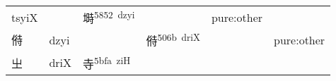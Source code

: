 \documentclass[14pt,a4paper]{scrartcl}
\begin{document}
\begin{longtable}[c]{@{}llllll@{}}
\begin{minipage}[t]{0.14\columnwidth}
tsyiX
\strut\end{minipage} &
\begin{minipage}[t]{0.14\columnwidth}\raggedright\strut
\strut\end{minipage} &
\begin{minipage}[t]{0.14\columnwidth}\raggedright\strut
塒\textsuperscript{5852~dzyi}
\strut\end{minipage} &
\begin{minipage}[t]{0.14\columnwidth}\raggedright\strut
\strut\end{minipage} &
\begin{minipage}[t]{0.14\columnwidth}\raggedright\strut
pure:other
\strut\end{minipage}\tabularnewline
\begin{minipage}[t]{0.14\columnwidth}\raggedright\strut
偫
\strut\end{minipage} &
\begin{minipage}[t]{0.14\columnwidth}\raggedright\strut
dzyi
\strut\end{minipage} &
\begin{minipage}[t]{0.14\columnwidth}\raggedright\strut
\strut\end{minipage} &
\begin{minipage}[t]{0.14\columnwidth}\raggedright\strut
偫\textsuperscript{506b~driX}
\strut\end{minipage} &
\begin{minipage}[t]{0.14\columnwidth}\raggedright\strut
\strut\end{minipage} &
\begin{minipage}[t]{0.14\columnwidth}\raggedright\strut
pure:other
\strut\end{minipage}\tabularnewline
\begin{minipage}[t]{0.14\columnwidth}\raggedright\strut
㞢
\strut\end{minipage} &
\begin{minipage}[t]{0.14\columnwidth}\raggedright\strut
driX
\strut\end{minipage} &
\begin{minipage}[t]{0.14\columnwidth}\raggedright\strut
寺\textsuperscript{5bfa~ziH}
\strut\end{minipage} &
\begin{minipage}[t]{0.14\columnwidth}\raggedright\strut
\strut\end{minipage} &
\begin{minipage}[t]{0.14\columnwidth}\raggedright\strut
\strut\end{minipage} &

\end{longtable}
\end{document}
